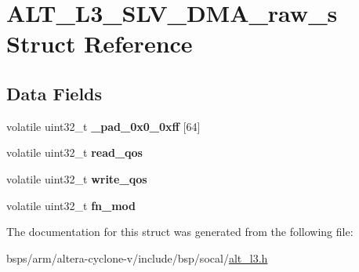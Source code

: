 \hypertarget{structALT__L3__SLV__DMA__raw__s}{}\section{A\+L\+T\+\_\+\+L3\+\_\+\+S\+L\+V\+\_\+\+D\+M\+A\+\_\+raw\+\_\+s Struct Reference}
\label{structALT__L3__SLV__DMA__raw__s}
\subsection*{Data Fields}
\begin{DoxyCompactItemize}
\item 
\mbox{\label{structALT__L3__SLV__DMA__raw__s_aa2bb987e2eaaa5e4d40ba95e1132f9f8}} 
volatile uint32\+\_\+t {\bfseries \+\_\+pad\+\_\+0x0\+\_\+0xff} \mbox{[}64\mbox{]}
\item 
\mbox{\label{structALT__L3__SLV__DMA__raw__s_a4865a6a8b59fd979b18ddbc4c7ae0a3f}} 
volatile uint32\+\_\+t {\bfseries read\+\_\+qos}
\item 
\mbox{\label{structALT__L3__SLV__DMA__raw__s_a11e969333f5847e563f8dd935ac5b0e0}} 
volatile uint32\+\_\+t {\bfseries write\+\_\+qos}
\item 
\mbox{\label{structALT__L3__SLV__DMA__raw__s_adefbb5222cf653f581aaf3adc6aab4ea}} 
volatile uint32\+\_\+t {\bfseries fn\+\_\+mod}
\end{DoxyCompactItemize}


The documentation for this struct was generated from the following file\+:\begin{DoxyCompactItemize}
\item 
bsps/arm/altera-\/cyclone-\/v/include/bsp/socal/\mbox{\hyperlink{alt__l3_8h}{alt\+\_\+l3.\+h}}\end{DoxyCompactItemize}
